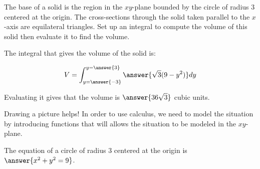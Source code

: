 \documentclass{ximera}
\author{Jim Talamo and Alex Beckwith}
\begin{document}
\begin{exercise}
	The base of a solid is the region in the $xy$-plane bounded by the circle of radius 3 centered at the origin. The cross-sections through the solid taken parallel to the $x$-axis are equilateral triangles. Set up an integral to compute the volume of this solid then evaluate it to find the volume.
	
The integral that gives the volume of the solid is:

	\[
	V= \int_{y=\answer{-3}}^{y=\answer{3}}
	\answer{\sqrt{3} (9-y^2)} dy
	\]

Evaluating it gives that the volume is $\answer{36\sqrt{3}}$ cubic units.
	
	\begin{hint}
	
	Drawing a picture helps!  In order to use calculus, we need to model the situation by introducing functions that will allows the situation to be modeled in the $xy$-plane.  
	
	\begin{exercise}
	The equation of a circle of radius 3 centered at the origin is $\answer{x^2+y^2=9}$.
	
	\begin{exercise}
	
	    \begin{image}
\end{image}
\end{exercise}
\end{exercise}
\end{hint}
\end{exercise}
\end{document}
